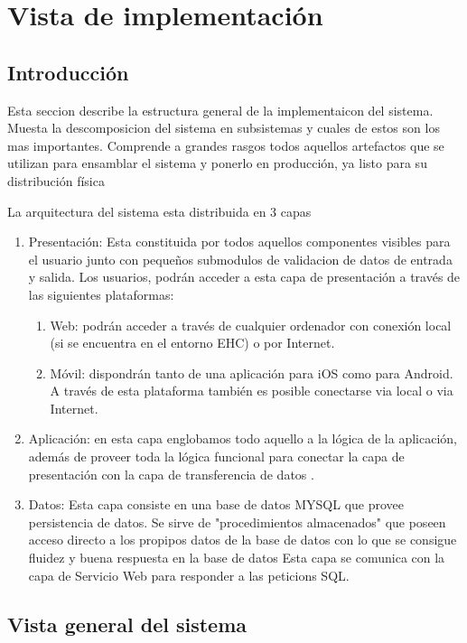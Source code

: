 \chapter{Vista de implementación}

\section{Introducción}
Esta seccion describe la estructura general de la implementaicon del sistema. Muesta la descomposicion del sistema en subsistemas y cuales de estos son los mas importantes. Comprende a grandes rasgos todos aquellos artefactos que se utilizan para ensamblar el sistema y ponerlo en producción, ya listo para su distribución física

La arquitectura del sistema esta distribuida en 3 capas
\begin{enumerate}
\item Presentaci\'on: Esta constituida por todos aquellos componentes visibles para el usuario junto con pequeños submodulos de validacion de datos de entrada y salida. Los usuarios, podrán acceder a esta capa de presentación a través de las siguientes plataformas:
\begin{enumerate}
\item Web: podr\'an acceder a trav\'es de cualquier ordenador con conexi\'on local (si se encuentra en el entorno EHC) o por Internet.
\item M\'ovil: dispondr\'an tanto de una aplicaci\'on para iOS como para Android. A través de esta plataforma también es posible conectarse via local o via Internet.
\end{enumerate}
\item Aplicaci\'on: en esta capa englobamos todo aquello a la l\'ogica de la aplicaci\'on, además de proveer toda la lógica funcional para conectar la capa de presentación con la capa de transferencia de datos . 
\item Datos:   Esta capa consiste en una base de datos MYSQL que provee persistencia de datos. Se sirve de "procedimientos almacenados" que poseen acceso directo a los propipos datos de la base de datos con lo que se consigue fluidez y buena respuesta en la base de datos
    Esta capa se comunica con la capa de Servicio Web para responder a las peticions SQL.
\end{enumerate}


\section{Vista general del sistema}

